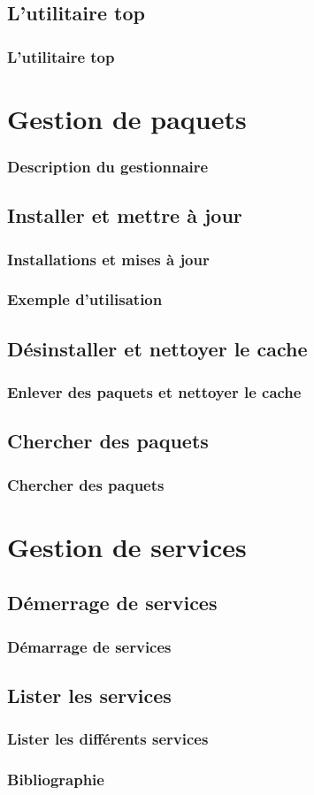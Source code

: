 \documentclass{beamer}
\begin{document}
    \subsection{L'utilitaire top}
    \begin{frame}
        \frametitle{L'utilitaire top}
    \end{frame}

    \section{Gestion de paquets}
    \begin{frame}
        \frametitle{Description du gestionnaire}
    \end{frame}

    \subsection{Installer et mettre à jour}
    \begin{frame}
        \frametitle{Installations et mises à jour}
    \end{frame}

    \begin{frame}
        \frametitle{Exemple d'utilisation}
    \end{frame}

    \subsection{Désinstaller et nettoyer le cache}
    \begin{frame}
        \frametitle{Enlever des paquets et nettoyer le cache}
    \end{frame}

    \subsection{Chercher des paquets}
    \begin{frame}
        \frametitle{Chercher des paquets}
    \end{frame}
    
    \section{Gestion de services}
    \subsection{Démerrage de services}
    \begin{frame}
        \frametitle{Démarrage de services}
    \end{frame}

    \subsection{Lister les services}
    \begin{frame}
        \frametitle{Lister les différents services}
    \end{frame}

    \begin{frame}[plain]
        \frametitle{Bibliographie}
    \end{frame}
\end{document}
